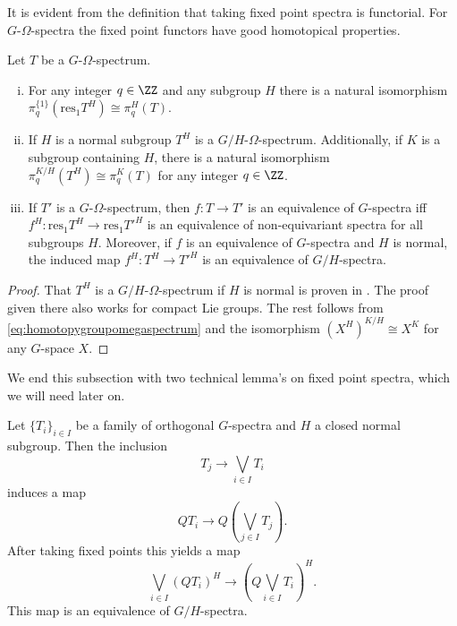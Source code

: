 It is evident from the definition that taking fixed point spectra is functorial.
For $G$-$\Omega$-spectra the fixed point functors have good homotopical
properties.
\begin{lem}\label{lem:omegaspectrafixedpoints}
Let $T$ be a $G$-$\Omega$-spectrum.
\begin{enumerate}[(i)]
\item For any integer $q\in \ZZ$ and any subgroup $H$ there is a natural isomorphism $\pi_q^{\{1\}}(\mathrm{res}_1 T^H)\cong \pi_q^H(T)$.
\item  If $H$ is a normal subgroup $T^H$ is a $G/H$-$\Omega$-spectrum. Additionally,
if $K$ is a subgroup containing $H$, there is a natural isomorphism
$\pi_q^{K/H}(T^H)\cong \pi_q^K(T)$ for any integer $q\in \ZZ$.
\item If $T'$ is a $G$-$\Omega$-spectrum, then $f:T\to T'$ is an equivalence of $G$-spectra
iff $f^H: \mathrm{res}_1 T^H\to \mathrm{res}_1 T'^H$ is an equivalence of non-equivariant spectra
for all subgroups $H$. Moreover, if $f$ is an equivalence of $G$-spectra and $H$ is normal, the induced
map $f^H:T^H\to T'^H$ is an equivalence of $G/H$-spectra.
\end{enumerate}
\end{lem}

\begin{proof}
That $T^H$ is a $G/H$-$\Omega$-spectrum if $H$ is normal 
is proven in \cite[Lemma~6.20, \pno~24]{rvadams}. The
proof given there also works for compact Lie groups. The rest follows
from \eqref{eq:homotopygroupomegaspectrum} and the isomorphism 
$
(X^H)^{K/H}\cong X^K
$
for any $G$-space $X$. 
\end{proof}

We end this subsection with two technical lemma's on fixed point spectra, which we will need later on.

\begin{lem}\label{lem:wedgefixed}
Let $\{T_i\}_{i\in I}$ be a family of  orthogonal $G$-spectra and $H$ a closed normal subgroup. Then the inclusion
$$T_j\rightarrow \bigvee_{i\in I } T_i$$ induces a map
$$QT_i\rightarrow Q\left(\bigvee_{j \in I } T_j\right).$$ After taking fixed points
this yields a map 
$$\bigvee_{i\in I}(QT_i)^H\rightarrow \left(Q\bigvee_{i \in I } T_i\right)^H.$$
This map is an equivalence of $G/H$-spectra.
\end{lem}

